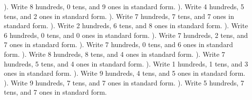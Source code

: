 \documentclass{article}%
\begin{document}
). Write 8 hundreds, 0 tens, and 9 ones in standard form.%
\newline%
\newline%
). Write 4 hundreds, 5 tens, and 2 ones in standard form.%
\newline%
\newline%
). Write 7 hundreds, 7 tens, and 7 ones in standard form.%
\newline%
\newline%
). Write 2 hundreds, 6 tens, and 8 ones in standard form.%
\newline%
\newline%
). Write 6 hundreds, 0 tens, and 0 ones in standard form.%
\newline%
\newline%
). Write 7 hundreds, 2 tens, and 7 ones in standard form.%
\newline%
\newline%
). Write 7 hundreds, 0 tens, and 6 ones in standard form.%
\newline%
\newline%
). Write 8 hundreds, 8 tens, and 4 ones in standard form.%
\newline%
\newline%
). Write 7 hundreds, 5 tens, and 4 ones in standard form.%
\newline%
\newline%
). Write 1 hundreds, 1 tens, and 3 ones in standard form.%
\newline%
\newline%
). Write 9 hundreds, 4 tens, and 5 ones in standard form.%
\newline%
\newline%
). Write 9 hundreds, 7 tens, and 7 ones in standard form.%
\newline%
\newline%
). Write 5 hundreds, 7 tens, and 7 ones in standard form.%
\end{document}
